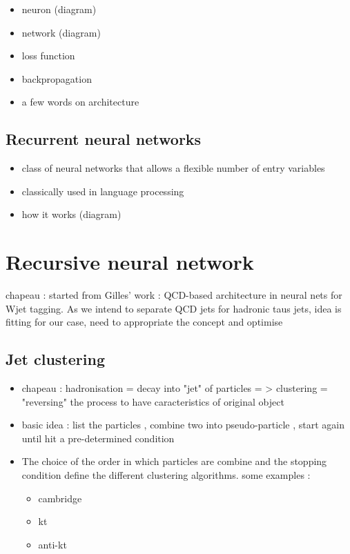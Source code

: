 \begin{itemize}
    \item neuron (diagram)
    \item network (diagram)
    \item loss function
    \item backpropagation
    \item a few words on architecture
\end{itemize}

\subsection{Recurrent neural networks}

\begin{itemize}
    \item class of neural networks that allows a flexible number of entry variables
    \item classically used in language processing
    \item how it works (diagram)
\end{itemize}

\section{Recursive neural network}

chapeau : started from Gilles' work : QCD-based architecture in neural nets for Wjet tagging. As we intend to separate QCD jets for hadronic taus jets, idea is fitting for our case, need to appropriate the concept and optimise

\subsection{Jet clustering}

\begin{itemize}
    \item chapeau : hadronisation = decay into "jet" of particles = > clustering = "reversing" the process to have caracteristics of original object
    \item basic idea : list the particles , combine two into pseudo-particle , start again until hit a pre-determined condition
    \item  The choice of the order in which particles are combine and the stopping condition define the different clustering algorithms. some examples :



\begin{itemize}
    \item cambridge
    \item kt
    \item anti-kt
\end{itemize}

\end{itemize}

